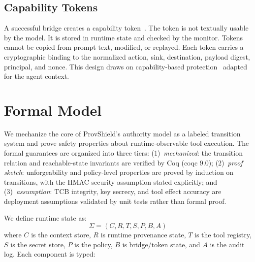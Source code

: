 \documentclass[sigconf,anonymous,review]{acmart}
\begin{document}
\subsection{Capability Tokens}
\label{sec:tokens}

A successful bridge creates a capability token~\cite{miller2006capabilities,dennis1966semantics}. The token is not textually usable by the model. It is stored in runtime state and checked by the monitor. Tokens cannot be copied from prompt text, modified, or replayed. Each token carries a cryptographic binding to the normalized action, sink, destination, payload digest, principal, and nonce. This design draws on capability-based protection~\cite{miller2006capabilities} adapted for the agent context.

\section{Formal Model}
\label{sec:formal}

We mechanize the core of ProvShield's authority model as a labeled transition system and prove safety properties about runtime-observable tool execution. The formal guarantees are organized into three tiers: (1)~\emph{mechanized}: the transition relation and reachable-state invariants are verified by Coq (coqc 9.0); (2)~\emph{proof sketch}: unforgeability and policy-level properties are proved by induction on transitions, with the HMAC security assumption stated explicitly; and (3)~\emph{assumption}: TCB integrity, key secrecy, and tool effect accuracy are deployment assumptions validated by unit tests rather than formal proof.

We define runtime state as:
\begin{equation}
\Sigma = (C, R, T, S, P, B, A)
\label{eq:state}
\end{equation}
where $C$ is the context store, $R$ is runtime provenance state, $T$ is the tool registry, $S$ is the secret store, $P$ is the policy, $B$ is bridge/token state, and $A$ is the audit log. Each component is typed:
\end{document}
